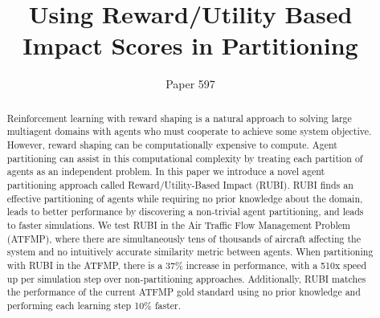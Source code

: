 \documentclass{aamas2014}
\begin{document}



\title{Using Reward/Utility Based Impact Scores in Partitioning}




\author{
Paper 597
}

\maketitle


\begin{abstract}
Reinforcement learning with reward shaping is a natural approach to solving large multiagent domains with agents who must cooperate to achieve some system objective. However, reward shaping can be computationally expensive to compute. Agent partitioning can assist in this computational complexity by treating each partition of agents as an independent problem. In this paper we introduce a novel agent partitioning approach called Reward/Utility-Based Impact (RUBI). RUBI finds an effective partitioning of agents while requiring no prior knowledge about the domain, leads to better performance by discovering a non-trivial agent partitioning, and leads to faster simulations. We test RUBI in the Air Traffic Flow Management Problem (ATFMP), where there are simultaneously tens of thousands of aircraft affecting the system and no intuitively accurate similarity metric between agents. When partitioning with RUBI in the ATFMP, there is a 37\% increase in performance, with a 510x speed up per simulation step over non-partitioning approaches. Additionally, RUBI matches the performance of the current ATFMP gold standard using no prior knowledge and performing each learning step 10\% faster.

\end{abstract}
\end{document}
